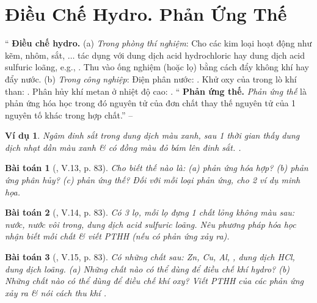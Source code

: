 \documentclass{article}
\newtheorem{baitoan}{Bài toán}
\newtheorem{vidu}{Ví dụ}
\begin{document}
\section{Điều Chế Hydro. Phản Ứng Thế}
`` \textbf{Điều chế hydro.} (a) \textit{Trong phòng thí nghiệm}: Cho các kim loại hoạt động như kẽm, nhôm, sắt, $\ldots$ tác dụng với dung dịch acid hydrochloric hay dung dịch acid sulfuric loãng, e.g., . Thu  vào ống nghiệm (hoặc lọ) bằng cách đẩy không khí hay đẩy nước. (b) \textit{Trong công nghiệp}: Điện phân nước: . Khử oxy của  trong lò khí than: . Phân hủy khí metan ở nhiệt độ cao: . `` \textbf{Phản ứng thế.} \textit{Phản ứng thế} là phản ứng hóa học trong đó nguyên tử của đơn chất thay thế nguyên tử của 1 nguyên tố khác trong hợp chất.'' -- \cite[Chap. 5, \S3, pp. 82--83]{Truong_BTNC_Hoa_Hoc_8_2022}

\begin{vidu}
	Ngâm đinh sắt trong dung dịch \emph{} màu xanh, sau 1 thời gian thấy dung dịch nhạt dần màu xanh \& có đồng màu đỏ bám lên đinh sắt. \emph{}.
\end{vidu}

\begin{baitoan}[\cite{Truong_BTNC_Hoa_Hoc_8_2022}, V.13, p. 83]
	Cho biết thế nào là: (a) phản ứng hóa hợp? (b) phản ứng phân hủy? (c) phản ứng thế? Đối với mỗi loại phản ứng, cho 2 ví dụ minh họa.
\end{baitoan}

\begin{baitoan}[\cite{Truong_BTNC_Hoa_Hoc_8_2022}, V.14, p. 83]
	Có 3 lọ, mỗi lọ đựng 1 chất lỏng không màu sau: nước, nước vôi trong, dung dịch acid sulfuric loãng. Nêu phương pháp hóa học nhận biết mỗi chất \& viết PTHH (nếu có phản ứng xảy ra).
\end{baitoan}

\begin{baitoan}[\cite{Truong_BTNC_Hoa_Hoc_8_2022}, V.15, p. 83]
	Có những chất sau: \emph{Zn, Cu, Al, }, dung dịch \emph{HCl}, dung dịch \emph{} loãng. (a) Những chất nào có thể dùng để điều chế khí hydro? (b) Những chất nào có thể dùng để điều chế khí oxy? Viết PTHH của các phản ứng xảy ra \& nói cách thu khí \emph{}.
\end{baitoan}
\end{document}
